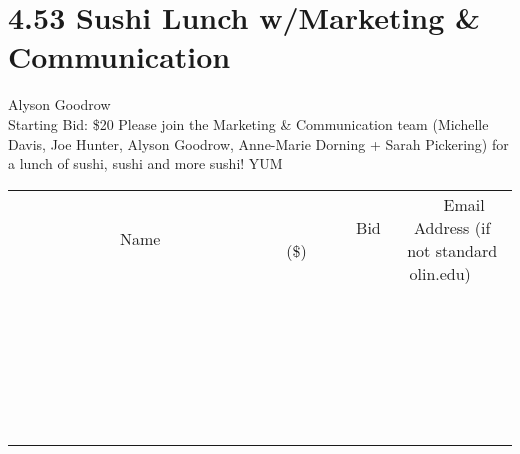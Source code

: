 \documentclass[11pt]{article}
\begin{document}
\section*{4.53 Sushi Lunch w/Marketing \& Communication}
Alyson Goodrow
\\
Starting Bid: \$20
\newline
Please join the Marketing \& Communication team (Michelle Davis, Joe Hunter, Alyson Goodrow, Anne-Marie Dorning + Sarah Pickering) for a lunch of sushi, sushi and more sushi! YUM
\\[6ex]
\begin{tabular}{c c c}
~~~~~~~~~~~~~Name~~~~~~~~~~~~~ & ~~~~~~~~~Bid (\$)~~~~~~~~~  & ~~~Email Address (if not standard olin.edu)~~~\\
 & & \\
\hline
 & & \\
\hline
 & & \\
\hline
 & & \\
\hline
 & & \\
\hline
 & & \\
\hline
 & & \\
\hline
 & & \\
\hline
 & & \\
\hline
 & & \\
\hline
 & & \\
\hline
 & & \\
\hline
 & & \\
\hline
 & & \\
\hline
 & & \\
\hline
 & & \\
\hline
 & & \\
\hline
 & & \\
\hline
 & & \\
\hline
 & & \\
\hline
 & & \\
\hline
 & & \\
\hline
 & & \\
\hline
 & & \\
\hline
 & & \\
\hline
 & & \\
\hline
\end{tabular}
\newpage
\end{document}
